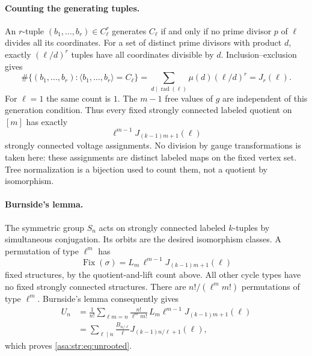 \documentclass[11pt,letterpaper]{article}
\theoremstyle{remark}\newtheorem{remark}[theorem]{Remark}
\numberwithin{equation}{section}
\begin{document}
\paragraph{Counting the generating tuples.}
An $r$-tuple $(b_1,\ldots,b_r)\in C_\ell^r$ generates $C_\ell$
if and only if no prime divisor $p$ of $\ell$ divides all its
coordinates.  For a set of distinct prime divisors with product
$d$, exactly $(\ell/d)^r$ tuples have all coordinates divisible
by $d$.  Inclusion--exclusion gives
\[
 \#\{(b_1,\ldots,b_r):\langle b_1,\ldots,b_r\rangle=C_\ell\}
 =\sum_{d\mid\operatorname{rad}(\ell)}\mu(d)(\ell/d)^r
 =J_r(\ell).
\]
For $\ell=1$ the same count is $1$.  The $m-1$ free values of $g$
are independent of this generation condition.  Thus every fixed
strongly connected labeled quotient on $[m]$ has exactly
\begin{equation}
 \ell^{m-1}J_{(k-1)m+1}(\ell)
 \label{asa:str:eq:strong-connected-lift-count}
\end{equation}
strongly connected voltage assignments.  No division by gauge
transformations is taken here: these assignments are distinct
labeled maps on the fixed vertex set.  Tree normalization is a
bijection used to count them, not a quotient by isomorphism.

\paragraph{Burnside's lemma.}
The symmetric group $S_n$ acts on strongly connected labeled
$k$-tuples by simultaneous conjugation.  Its orbits are the desired
isomorphism classes.  A permutation of type $\ell^m$ has
\[
 \operatorname{Fix}(\sigma)
 =L_m\,\ell^{m-1}J_{(k-1)m+1}(\ell)
\]
fixed structures, by the quotient-and-lift count above.  All other
cycle types have no fixed strongly connected structures.  There
are $n!/(\ell^m m!)$ permutations of type $\ell^m$.  Burnside's
lemma consequently gives
\begin{align*}
 U_n
 &=\frac1{n!}\sum_{\ell m=n}
   \frac{n!}{\ell^m m!}\,
   L_m\ell^{m-1}J_{(k-1)m+1}(\ell)\\
 &=\sum_{\ell\mid n}
   \frac{B_{n/\ell}}{\ell}J_{(k-1)n/\ell+1}(\ell),
\end{align*}
which proves \eqref{asa:str:eq:unrooted}.
\end{document}
